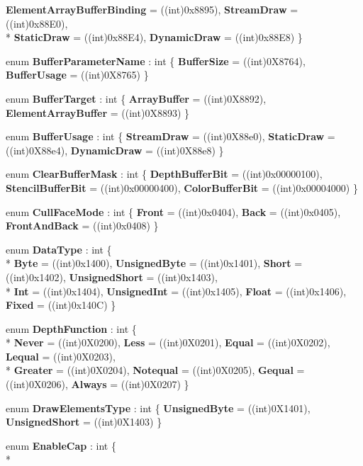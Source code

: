\begin{DoxyCompactItemize}
{\bfseries Element\-Array\-Buffer\-Binding} = ((int)0x8895), 
{\bfseries Stream\-Draw} = ((int)0x88\-E0), 
\\*
{\bfseries Static\-Draw} = ((int)0x88\-E4), 
{\bfseries Dynamic\-Draw} = ((int)0x88\-E8)
 \}
\item 
enum {\bfseries Buffer\-Parameter\-Name} \-: int \{ {\bfseries Buffer\-Size} = ((int)0\-X8764), 
{\bfseries Buffer\-Usage} = ((int)0\-X8765)
 \}
\item 
enum {\bfseries Buffer\-Target} \-: int \{ {\bfseries Array\-Buffer} = ((int)0\-X8892), 
{\bfseries Element\-Array\-Buffer} = ((int)0\-X8893)
 \}
\item 
enum {\bfseries Buffer\-Usage} \-: int \{ {\bfseries Stream\-Draw} = ((int)0\-X88e0), 
{\bfseries Static\-Draw} = ((int)0\-X88e4), 
{\bfseries Dynamic\-Draw} = ((int)0\-X88e8)
 \}
\item 
enum {\bfseries Clear\-Buffer\-Mask} \-: int \{ {\bfseries Depth\-Buffer\-Bit} = ((int)0x00000100), 
{\bfseries Stencil\-Buffer\-Bit} = ((int)0x00000400), 
{\bfseries Color\-Buffer\-Bit} = ((int)0x00004000)
 \}
\item 
enum {\bfseries Cull\-Face\-Mode} \-: int \{ {\bfseries Front} = ((int)0x0404), 
{\bfseries Back} = ((int)0x0405), 
{\bfseries Front\-And\-Back} = ((int)0x0408)
 \}
\item 
enum {\bfseries Data\-Type} \-: int \{ \\*
{\bfseries Byte} = ((int)0x1400), 
{\bfseries Unsigned\-Byte} = ((int)0x1401), 
{\bfseries Short} = ((int)0x1402), 
{\bfseries Unsigned\-Short} = ((int)0x1403), 
\\*
{\bfseries Int} = ((int)0x1404), 
{\bfseries Unsigned\-Int} = ((int)0x1405), 
{\bfseries Float} = ((int)0x1406), 
{\bfseries Fixed} = ((int)0x140\-C)
 \}
\item 
enum {\bfseries Depth\-Function} \-: int \{ \\*
{\bfseries Never} = ((int)0\-X0200), 
{\bfseries Less} = ((int)0\-X0201), 
{\bfseries Equal} = ((int)0\-X0202), 
{\bfseries Lequal} = ((int)0\-X0203), 
\\*
{\bfseries Greater} = ((int)0\-X0204), 
{\bfseries Notequal} = ((int)0\-X0205), 
{\bfseries Gequal} = ((int)0\-X0206), 
{\bfseries Always} = ((int)0\-X0207)
 \}
\item 
enum {\bfseries Draw\-Elements\-Type} \-: int \{ {\bfseries Unsigned\-Byte} = ((int)0\-X1401), 
{\bfseries Unsigned\-Short} = ((int)0\-X1403)
 \}
\item 
enum {\bfseries Enable\-Cap} \-: int \{ \\*

\end{DoxyCompactItemize}
